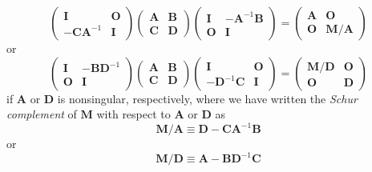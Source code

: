 \documentclass[12pt,a4paper]{article}
\begin{document}
\begin{equation}
\begin{pmatrix}
\mathbf{I} & \mathbf{O} \\
-\mathbf{C}\mathbf{A}^{-1} & \mathbf{I}
\end{pmatrix}
\begin{pmatrix}
\mathbf{A} & \mathbf{B} \\
\mathbf{C} & \mathbf{D}
\end{pmatrix}
\begin{pmatrix}
\mathbf{I} & -\mathbf{A}^{-1}\mathbf{B} \\
\mathbf{O} & \mathbf{I}
\end{pmatrix}
=
\begin{pmatrix}
\mathbf{A} & \mathbf{O} \\
\mathbf{O} & \mathbf{M}/\mathbf{A}
\end{pmatrix}
\label{eq:block_diagonalization_of_partitioned_matrix_with_Schur_complement_wrt_A}
\end{equation}
or
\begin{equation}
\begin{pmatrix}
\mathbf{I} & -\mathbf{B}\mathbf{D}^{-1} \\
\mathbf{O} & \mathbf{I}
\end{pmatrix}
\begin{pmatrix}
\mathbf{A} & \mathbf{B} \\
\mathbf{C} & \mathbf{D}
\end{pmatrix}
\begin{pmatrix}
\mathbf{I} & \mathbf{O} \\
-\mathbf{D}^{-1}\mathbf{C} & \mathbf{I}
\end{pmatrix}
=
\begin{pmatrix}
\mathbf{M}/\mathbf{D} & \mathbf{O} \\
\mathbf{O} & \mathbf{D}
\end{pmatrix}
\label{eq:block_diagonalization_of_partitioned_matrix_with_Schur_complement_wrt_D}
\end{equation}
if $\mathbf{A}$ or $\mathbf{D}$ is nonsingular, respectively,
where we have written the \emph{Schur complement} of $\mathbf{M}$ with respect to
$\mathbf{A}$ or $\mathbf{D}$ as
\begin{equation}
\mathbf{M}/\mathbf{A} \equiv \mathbf{D} - \mathbf{C}\mathbf{A}^{-1}\mathbf{B}
\label{eq:Schur_complement_of_M_wrt_A}
\end{equation}
or
\begin{equation}
\mathbf{M}/\mathbf{D} \equiv \mathbf{A} - \mathbf{B}\mathbf{D}^{-1}\mathbf{C}
\label{eq:Schur_complement_of_M_wrt_D}
\end{equation}
\end{document}
